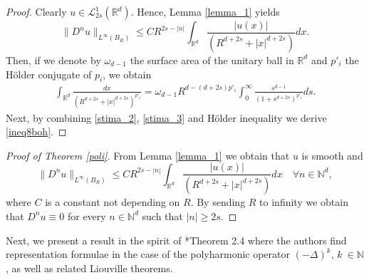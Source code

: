 \documentclass[letterpaper, 11pt,  reqno]{amsart}
\theoremstyle{definition}
\theoremstyle{remark}
\numberwithin{equation}{section}
\newcommand{\N}{{\mathbb N}}
\newcommand{\R}{{\mathbb R}}
\begin{document}
	\begin{proof}
		Clearly $u\in \mathscr{L}^{1}_{2s}(\R^d)$. Hence, Lemma \ref{lemma_1} yields
		\begin{equation}\label{stima_2}
			\|D^{n}u\|_{L^{\infty}(B_R)}\le CR^{2s-|n|}\int_{\R^d}\frac{|u(x)|}{(R^{d+2s}+|x|^{d+2s})}dx.
		\end{equation}
		Then, if we denote by $\omega_{d-1}$ the surface area of the unitary ball in $\R^d$ and $p'_i$ the H\"older conjugate of $p_i$, we obtain 
		\begin{equation}\label{stima_3}
			\begin{split}
				\int_{\R^d}\frac{dx}{(R^{d+2s}+|x|^{d+2s})^{p'_i}} =\omega_{d-1} R^{d-(d+2s)p'_i}\int_{0}^{\infty}\frac{s^{d-1}}{{(1+s^{d+2s})}^{p'_i}}ds.
			\end{split}
		\end{equation}
		Next, by combining \eqref{stima_2}, \eqref{stima_3} and H\"older inequality we derive \eqref{ineq8boh}.
	\end{proof}
	\begin{proof}[Proof of Theorem \ref{poli}]
	
	\noindent
		From Lemma \ref{lemma_1} we obtain that $u$ is smooth and
		$$\|D^{n}u\|_{L^{\infty}({B_R})}\le CR^{2s-|n|}\int_{\R^d}\frac{|u(x)|}{(R^{d+2s}+|x|^{d+2s})}dx\quad 	\forall n\in \N^{d},$$
		where $C$ is a constant not depending on $R$. By sending $R$ to infinity we obtain that $D^n u \equiv 0$ for every $n\in \N^d$ such that $|n|\ge 2s$.
	\end{proof}

 Next, we present a result in the spirit of \cite{mitidieri}*{Theorem 2.4} where the authors find representation formulae in the case of the polyharmonic operator $(-\Delta)^{k},\, k~{\in \N}$, as well as related Liouville theorems.
\end{document}
